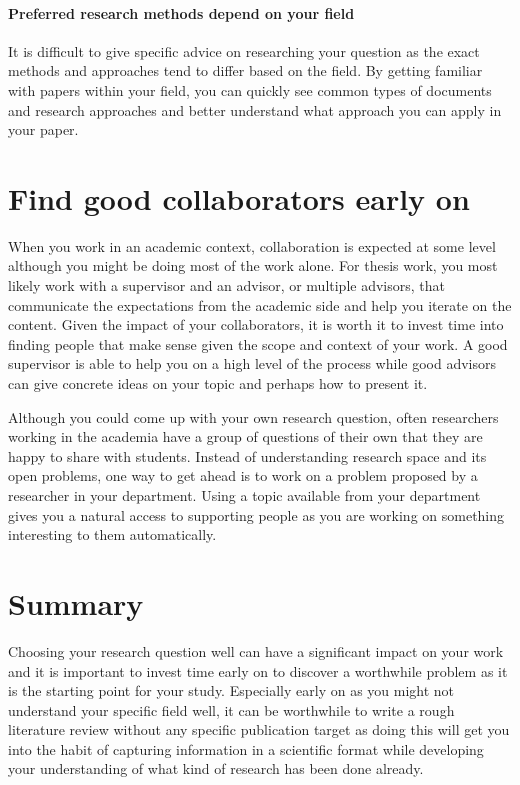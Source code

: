 \paragraph{Preferred research methods depend on your field}

It is difficult to give specific advice on researching your question as the exact methods and approaches tend to differ based on the field.
By getting familiar with papers within your field, you can quickly see common types of documents and research approaches and better understand what approach you can apply in your paper.

\section{Find good collaborators early on}

When you work in an academic context, collaboration is expected at some level although you might be doing most of the work alone.
For thesis work, you most likely work with a supervisor and an advisor, or multiple advisors, that communicate the expectations from the academic side and help you iterate on the content.
Given the impact of your collaborators, it is worth it to invest time into finding people that make sense given the scope and context of your work.
A good supervisor is able to help you on a high level of the process while good advisors can give concrete ideas on your topic and perhaps how to present it.

Although you could come up with your own research question, often researchers working in the academia have a group of questions of their own that they are happy to share with students.
Instead of understanding research space and its open problems, one way to get ahead is to work on a problem proposed by a researcher in your department.
Using a topic available from your department gives you a natural access to supporting people as you are working on something interesting to them automatically.

\section{Summary}

Choosing your research question well can have a significant impact on your work and it is important to invest time early on to discover a worthwhile problem as it is the starting point for your study.
Especially early on as you might not understand your specific field well, it can be worthwhile to write a rough literature review without any specific publication target as doing this will get you into the habit of capturing information in a scientific format while developing your understanding of what kind of research has been done already.
